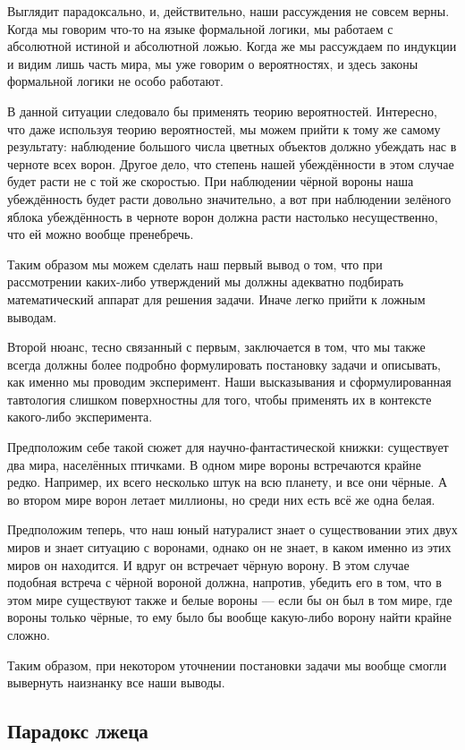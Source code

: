 Выглядит парадоксально, и, действительно, наши рассуждения не совсем верны. Когда мы говорим что-то на языке формальной логики, мы работаем с абсолютной истиной и абсолютной ложью. Когда же мы рассуждаем по индукции и видим лишь часть мира, мы уже говорим о вероятностях, и здесь законы формальной логики не особо работают.

В данной ситуации следовало бы применять теорию вероятностей. Интересно, что даже используя теорию вероятностей, мы можем прийти к тому же самому результату: наблюдение большого числа цветных объектов должно убеждать нас в черноте всех ворон. Другое дело, что степень нашей убеждённости в этом случае будет расти не с той же скоростью. При наблюдении чёрной вороны наша убеждённость будет расти довольно значительно, а вот при наблюдении зелёного яблока убеждённость в черноте ворон должна расти настолько несущественно, что ей можно вообще пренебречь.

Таким образом мы можем сделать наш первый вывод о том, что при рассмотрении каких-либо утверждений мы должны адекватно подбирать математический аппарат для решения задачи. Иначе легко прийти к ложным выводам.

Второй нюанс, тесно связанный с первым, заключается в том, что мы также всегда должны более подробно формулировать постановку задачи и описывать, как именно мы проводим эксперимент. Наши высказывания и сформулированная тавтология слишком поверхностны для того, чтобы применять их в контексте какого-либо эксперимента.

Предположим себе такой сюжет для научно-фантастической книжки: существует два мира, населённых птичками. В одном мире вороны встречаются крайне редко. Например, их всего нес\-коль\-ко штук на всю планету, и все они чёрные. А во втором мире ворон летает миллионы, но среди них есть всё же одна белая.

Предположим теперь, что наш юный натуралист знает о существовании этих двух миров и знает ситуацию с воронами, однако он не знает, в каком именно из этих миров он находится. И вдруг он встречает чёрную ворону. В этом случае подобная встреча с чёрной вороной должна, напротив, убедить его в том, что в этом мире существуют также и белые вороны — если бы он был в том мире, где вороны только чёрные, то ему было бы вообще какую-либо ворону найти крайне сложно.

Таким образом, при некотором уточнении постановки задачи мы вообще смогли вывернуть наизнанку все наши выводы.

\subsection{Парадокс лжеца}

